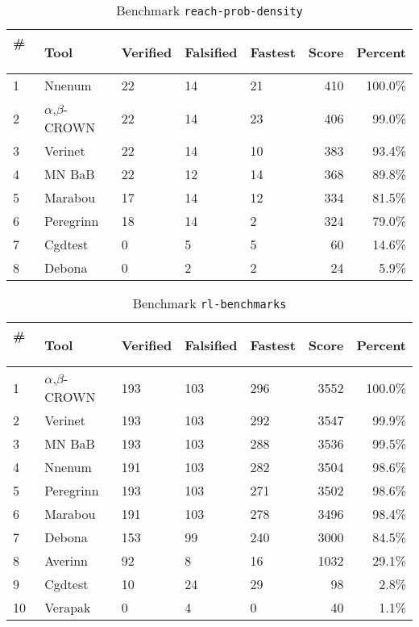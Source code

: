 
\begin{table}[h]
\begin{center}
\caption{Benchmark \texttt{reach-prob-density}} \label{tab:cat_{cat}}
{\setlength{\tabcolsep}{2pt}
\begin{tabular}[h]{@{}lllllrr@{}}
\toprule
\textbf{\# ~} & \textbf{Tool} & \textbf{Verified} & \textbf{Falsified} & \textbf{Fastest} & \textbf{Score} & \textbf{Percent}\\
\midrule
1 & Nnenum & 22 & 14 & 21 & 410 & 100.0\% \\
2 & $\alpha$,$\beta$-CROWN & 22 & 14 & 23 & 406 & 99.0\% \\
3 & Verinet & 22 & 14 & 10 & 383 & 93.4\% \\
4 & MN BaB & 22 & 12 & 14 & 368 & 89.8\% \\
5 & Marabou & 17 & 14 & 12 & 334 & 81.5\% \\
6 & Peregrinn & 18 & 14 & 2 & 324 & 79.0\% \\
7 & Cgdtest & 0 & 5 & 5 & 60 & 14.6\% \\
8 & Debona & 0 & 2 & 2 & 24 & 5.9\% \\
\bottomrule
\end{tabular}
}
\end{center}
\end{table}




\begin{table}[h]
\begin{center}
\caption{Benchmark \texttt{rl-benchmarks}} \label{tab:cat_{cat}}
{\setlength{\tabcolsep}{2pt}
\begin{tabular}[h]{@{}lllllrr@{}}
\toprule
\textbf{\# ~} & \textbf{Tool} & \textbf{Verified} & \textbf{Falsified} & \textbf{Fastest} & \textbf{Score} & \textbf{Percent}\\
\midrule
1 & $\alpha$,$\beta$-CROWN & 193 & 103 & 296 & 3552 & 100.0\% \\
2 & Verinet & 193 & 103 & 292 & 3547 & 99.9\% \\
3 & MN BaB & 193 & 103 & 288 & 3536 & 99.5\% \\
4 & Nnenum & 191 & 103 & 282 & 3504 & 98.6\% \\
5 & Peregrinn & 193 & 103 & 271 & 3502 & 98.6\% \\
6 & Marabou & 191 & 103 & 278 & 3496 & 98.4\% \\
7 & Debona & 153 & 99 & 240 & 3000 & 84.5\% \\
8 & Averinn & 92 & 8 & 16 & 1032 & 29.1\% \\
9 & Cgdtest & 10 & 24 & 29 & 98 & 2.8\% \\
10 & Verapak & 0 & 4 & 0 & 40 & 1.1\% \\
\bottomrule
\end{tabular}
}
\end{center}
\end{table}



